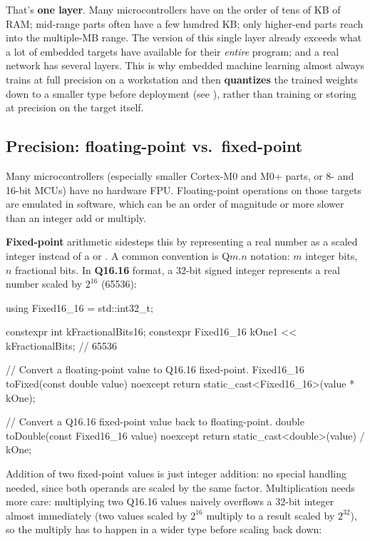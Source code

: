 \noindent That's \textbf{one layer}. Many microcontrollers have on the order of tens of KB of RAM;
mid-range parts often have a few hundred KB; only higher-end parts reach into the multiple-MB range.
The  version of this single layer already exceeds what a lot of embedded targets have
available for their \emph{entire} program; and a real network has several layers. This is why
embedded machine learning almost always trains at full precision on a workstation and then
\textbf{quantizes} the trained weights down to a smaller type before deployment (see
), rather than training or storing at  precision on the
target itself.

\subsection{Precision: floating-point vs.\ fixed-point}
\label{c10:sec:fixedpoint}
Many microcontrollers (especially smaller Cortex-M0 and M0+ parts, or 8- and 16-bit MCUs) have no
hardware FPU. Floating-point operations on those targets are emulated in software, which can be an
order of magnitude or more slower than an integer add or multiply.

\textbf{Fixed-point} arithmetic sidesteps this by representing a real number as a scaled integer
instead of a  or . A common convention is Q$m$.$n$ notation: $m$ integer
bits, $n$ fractional bits. In \textbf{Q16.16} format, a 32-bit signed integer represents a real
number scaled by $2^{16}$ (65536):

\begin{cppcode}
using Fixed16_16 = std::int32_t;

constexpr int kFractionalBits{16};
constexpr Fixed16_16 kOne{1 << kFractionalBits};  // 65536

// Convert a floating-point value to Q16.16 fixed-point.
Fixed16_16 toFixed(const double value) noexcept
{
    return static_cast<Fixed16_16>(value * kOne);
}

// Convert a Q16.16 fixed-point value back to floating-point.
double toDouble(const Fixed16_16 value) noexcept
{
    return static_cast<double>(value) / kOne;
}
\end{cppcode}

Addition of two fixed-point values is just integer addition: no special handling needed, since both
operands are scaled by the same factor. Multiplication needs more care: multiplying two Q16.16
values naively overflows a 32-bit integer almost immediately (two values scaled by $2^{16}$ multiply
to a result scaled by $2^{32}$), so the multiply has to happen in a wider type before scaling back
down:

